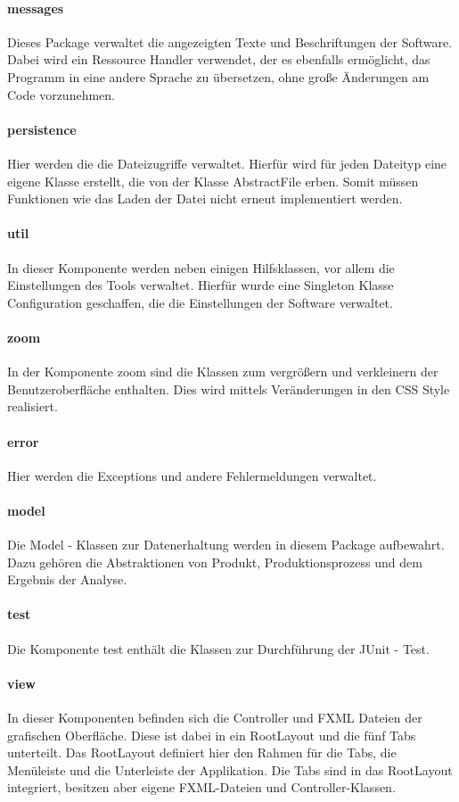 \documentclass[12pt,a4paper, listof=entryprefix, bibliography=totocnumbered,toc=listofnumbered,lof=listofnumbered]{scrartcl}
\begin{document}
\paragraph{messages}
Dieses Package verwaltet die angezeigten Texte und Beschriftungen der Software. Dabei wird ein Ressource Handler verwendet, der es ebenfalls ermöglicht, das Programm in eine andere Sprache zu übersetzen, ohne große Änderungen am Code vorzunehmen.
\paragraph{persistence}
Hier werden die die Dateizugriffe verwaltet. Hierfür wird für jeden Dateityp eine eigene Klasse erstellt, die von der Klasse AbstractFile erben. Somit müssen Funktionen wie das Laden der Datei nicht erneut implementiert werden.
\paragraph{util}
In dieser Komponente werden neben einigen Hilfsklassen, vor allem die Einstellungen des Tools verwaltet. Hierfür wurde eine Singleton Klasse Configuration geschaffen, die die Einstellungen der Software verwaltet.
\paragraph{zoom}
In der Komponente zoom sind die Klassen zum vergrößern und verkleinern der Benutzeroberfläche enthalten. Dies wird mittels Veränderungen in den \gls{CSS} Style realisiert.
\paragraph{error}
Hier werden die Exceptions und andere Fehlermeldungen verwaltet.
\paragraph{model}
Die Model - Klassen zur Datenerhaltung werden in diesem Package aufbewahrt. Dazu gehören die Abstraktionen von Produkt, Produktionsprozess und dem Ergebnis der Analyse.
\paragraph{test}
Die Komponente test enthält die Klassen zur Durchführung der JUnit - Test. 
\paragraph{view}
In dieser Komponenten befinden sich die Controller und FXML Dateien der grafischen Oberfläche. Diese ist dabei in ein RootLayout und die fünf Tabs unterteilt. Das RootLayout definiert hier den Rahmen für die Tabs, die Menüleiste und die Unterleiste der Applikation. Die Tabs sind in das RootLayout integriert, besitzen aber eigene FXML-Dateien und Controller-Klassen.
\end{document}
